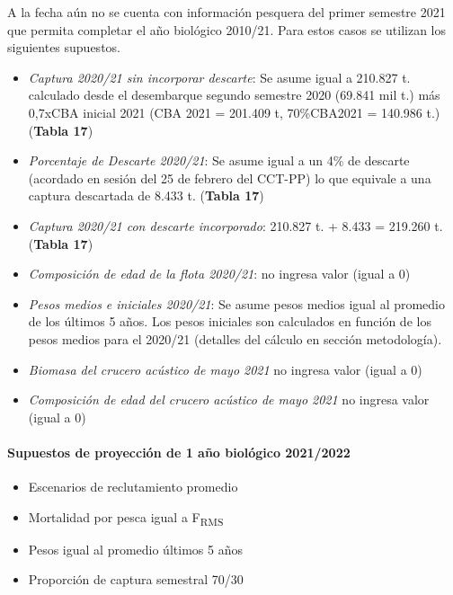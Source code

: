 \documentclass[
  spanish,
]{article}
\providecommand{\tightlist}{%
  \setlength{\itemsep}{0pt}\setlength{\parskip}{0pt}}
\begin{document}
\quad

A la fecha aún no se cuenta con información pesquera del primer semestre
2021 que permita completar el año biológico 2010/21. Para estos casos se
utilizan los siguientes supuestos.

\begin{itemize}
\tightlist
\item
  \emph{Captura 2020/21 sin incorporar descarte}: Se asume igual a
  210.827 t. calculado desde el desembarque segundo semestre 2020
  (69.841 mil t.) más 0,7xCBA inicial 2021 (CBA 2021 = 201.409 t,
  70\%CBA2021 = 140.986 t.) (\textbf{Tabla 17})
\item
  \emph{Porcentaje de Descarte 2020/21}: Se asume igual a un 4\% de
  descarte (acordado en sesión del 25 de febrero del CCT-PP) lo que
  equivale a una captura descartada de 8.433 t. (\textbf{Tabla 17})
\item
  \emph{Captura 2020/21 con descarte incorporado}: 210.827 t. + 8.433 =
  219.260 t. (\textbf{Tabla 17})
\item
  \emph{Composición de edad de la flota 2020/21}: no ingresa valor
  (igual a 0)
\item
  \emph{Pesos medios e iniciales 2020/21}: Se asume pesos medios igual
  al promedio de los últimos 5 años. Los pesos iniciales son calculados
  en función de los pesos medios para el 2020/21 (detalles del cálculo
  en sección metodología).
\item
  \emph{Biomasa del crucero acústico de mayo 2021} no ingresa valor
  (igual a 0)
\item
  \emph{Composición de edad del crucero acústico de mayo 2021} no
  ingresa valor (igual a 0)
\end{itemize}

\vspace{-0.2cm}

\hypertarget{supuestos-de-proyecciuxf3n-de-1-auxf1o-bioluxf3gico-20212022}{%
\paragraph{Supuestos de proyección de 1 año biológico
2021/2022}\label{supuestos-de-proyecciuxf3n-de-1-auxf1o-bioluxf3gico-20212022}}

\begin{itemize}
\tightlist
\item
  Escenarios de reclutamiento promedio
\item
  Mortalidad por pesca igual a F\textsubscript{RMS}
\item
  Pesos igual al promedio últimos 5 años
\item
  Proporción de captura semestral 70/30
\end{itemize}
\end{document}
